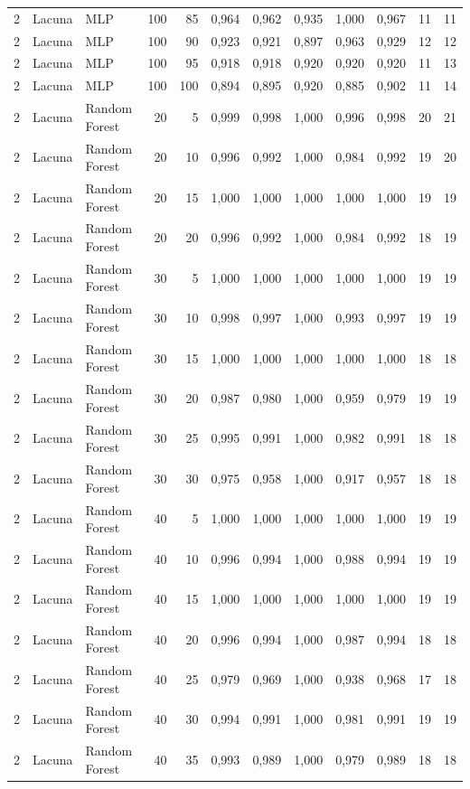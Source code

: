 \begin{longtable}{@{}rllrrrrrrrrr@{}}
2 & Lacuna & MLP & 100 & 85 & 0,964 & 0,962 & 0,935 & 1,000 & 0,967 & 11 & 11 \\
2 & Lacuna & MLP & 100 & 90 & 0,923 & 0,921 & 0,897 & 0,963 & 0,929 & 12 & 12 \\
2 & Lacuna & MLP & 100 & 95 & 0,918 & 0,918 & 0,920 & 0,920 & 0,920 & 11 & 13 \\
2 & Lacuna & MLP & 100 & 100 & 0,894 & 0,895 & 0,920 & 0,885 & 0,902 & 11 & 14 \\
2 & Lacuna & Random Forest & 20 & 5 & 0,999 & 0,998 & 1,000 & 0,996 & 0,998 & 20 & 21 \\
2 & Lacuna & Random Forest & 20 & 10 & 0,996 & 0,992 & 1,000 & 0,984 & 0,992 & 19 & 20 \\
2 & Lacuna & Random Forest & 20 & 15 & 1,000 & 1,000 & 1,000 & 1,000 & 1,000 & 19 & 19 \\
2 & Lacuna & Random Forest & 20 & 20 & 0,996 & 0,992 & 1,000 & 0,984 & 0,992 & 18 & 19 \\
2 & Lacuna & Random Forest & 30 & 5 & 1,000 & 1,000 & 1,000 & 1,000 & 1,000 & 19 & 19 \\
2 & Lacuna & Random Forest & 30 & 10 & 0,998 & 0,997 & 1,000 & 0,993 & 0,997 & 19 & 19 \\
2 & Lacuna & Random Forest & 30 & 15 & 1,000 & 1,000 & 1,000 & 1,000 & 1,000 & 18 & 18 \\
2 & Lacuna & Random Forest & 30 & 20 & 0,987 & 0,980 & 1,000 & 0,959 & 0,979 & 19 & 19 \\
2 & Lacuna & Random Forest & 30 & 25 & 0,995 & 0,991 & 1,000 & 0,982 & 0,991 & 18 & 18 \\
2 & Lacuna & Random Forest & 30 & 30 & 0,975 & 0,958 & 1,000 & 0,917 & 0,957 & 18 & 18 \\
2 & Lacuna & Random Forest & 40 & 5 & 1,000 & 1,000 & 1,000 & 1,000 & 1,000 & 19 & 19 \\
2 & Lacuna & Random Forest & 40 & 10 & 0,996 & 0,994 & 1,000 & 0,988 & 0,994 & 19 & 19 \\
2 & Lacuna & Random Forest & 40 & 15 & 1,000 & 1,000 & 1,000 & 1,000 & 1,000 & 19 & 19 \\
2 & Lacuna & Random Forest & 40 & 20 & 0,996 & 0,994 & 1,000 & 0,987 & 0,994 & 18 & 18 \\
2 & Lacuna & Random Forest & 40 & 25 & 0,979 & 0,969 & 1,000 & 0,938 & 0,968 & 17 & 18 \\
2 & Lacuna & Random Forest & 40 & 30 & 0,994 & 0,991 & 1,000 & 0,981 & 0,991 & 19 & 19 \\
2 & Lacuna & Random Forest & 40 & 35 & 0,993 & 0,989 & 1,000 & 0,979 & 0,989 & 18 & 18 \\

\end{longtable}
